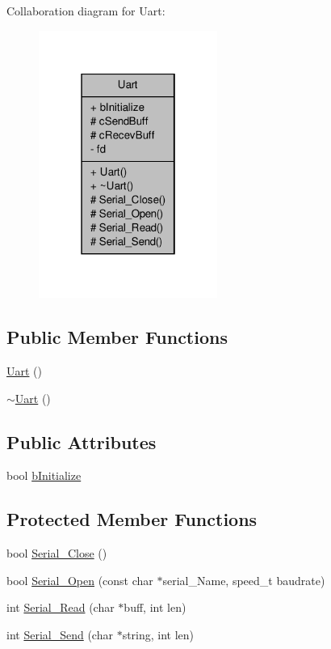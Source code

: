 Collaboration diagram for Uart\-:\nopagebreak
\begin{figure}[H]
\begin{center}
\leavevmode
\includegraphics[width=166pt]{classUart__coll__graph}
\end{center}
\end{figure}
\subsection*{Public Member Functions}
\begin{DoxyCompactItemize}
\item 
\hyperlink{classUart_af65a6888b8a623bdc70cfb5c5e8e9957}{Uart} ()
\item 
\hyperlink{classUart_a7160154094413395a23dbaa287dbef3c}{$\sim$\-Uart} ()
\end{DoxyCompactItemize}
\subsection*{Public Attributes}
\begin{DoxyCompactItemize}
\item 
bool \hyperlink{classUart_a082b349fdf73dd9f4e1a2f1a09af28c3}{b\-Initialize}
\end{DoxyCompactItemize}
\subsection*{Protected Member Functions}
\begin{DoxyCompactItemize}
\item 
bool \hyperlink{classUart_ac21470b359f66cc072f80b638258aa18}{Serial\-\_\-\-Close} ()
\item 
bool \hyperlink{classUart_ab41a877a430c87419c524c970d033ee5}{Serial\-\_\-\-Open} (const char $\ast$serial\-\_\-\-Name, speed\-\_\-t baudrate)
\item 
int \hyperlink{classUart_aba195c21510bc9bbab776b961d866e1e}{Serial\-\_\-\-Read} (char $\ast$buff, int len)
\item 
int \hyperlink{classUart_ace4b7eaee7374cac2c91ca627b2a78b6}{Serial\-\_\-\-Send} (char $\ast$string, int len)
\end{DoxyCompactItemize}
